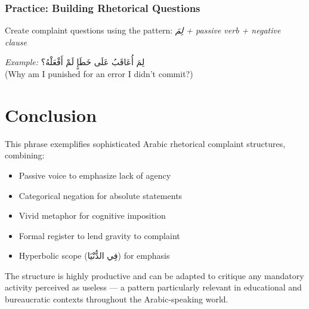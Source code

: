 \documentclass[letterpaper,12pt]{article}
\begin{document}
\subsubsection*{Practice: Building Rhetorical Questions}
Create complaint questions using the pattern: \textit{\textarabic{لِمَ} + passive verb + negative clause}

\textit{Example:} \textarabic{لِمَ أُعَاقَبُ عَلَى خَطَإٍ لَمْ أَفْعَلْهُ؟}\\
(Why am I punished for an error I didn't commit?)

\section{Conclusion}

This phrase exemplifies sophisticated Arabic rhetorical complaint structures, combining:
\begin{itemize}
\item Passive voice to emphasize lack of agency
\item Categorical negation for absolute statements
\item Vivid metaphor for cognitive imposition
\item Formal register to lend gravity to complaint
\item Hyperbolic scope (\textarabic{فِي الدُّنْيَا}) for emphasis
\end{itemize}

The structure is highly productive and can be adapted to critique any mandatory activity perceived as useless — a pattern particularly relevant in educational and bureaucratic contexts throughout the Arabic-speaking world.
\end{document}
